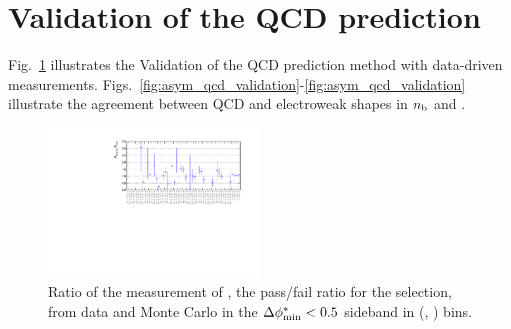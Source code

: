 \clearpage
\section{Validation of the QCD prediction \label{app:qcdPredictionValidation}}

Fig.~\ref{fig:RR_qcd} illustrates the Validation of the QCD prediction method with data-driven measurements. Figs.~\ref{fig:asym_qcd_validation}-\ref{fig:asym_qcd_validation} illustrate the agreement between QCD and electroweak shapes in $n_{\text{b}}$ and \mht.

\begin{figure}[h!]
  \begin{center}        
    \includegraphics[width=0.5\textwidth]{figures/qcd/validation/RRPlot}
    \caption{ Ratio of the measurement of \rmhtmet, the pass/fail ratio for the \mhtmet selection, from data and Monte Carlo in the $\mbox{$\Delta\phi^{*}_{\rm min}$} < 0.5$ sideband in (\scalht, \njet) bins.  
    }

    \label{fig:RR_qcd}
  \end{center} 
\end{figure}


